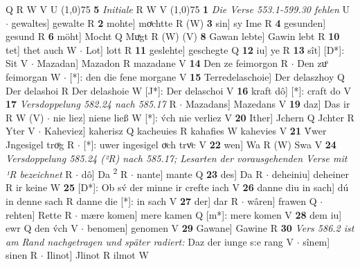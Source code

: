 \documentclass[8pt,a4paper,notitlepage]{article}
\begin{document}
\begin{table}[ht]
\begin{minipage}[t]{0.5\linewidth}
Q R W V U \newline
\line(1,0){75} \newline
\textbf{5} \textit{Initiale} R W V  \newline
\line(1,0){75} \newline
\textbf{1} \textit{Die Verse 553.1-599.30 fehlen} U   $\cdot$ gewaltes] gewalte R \textbf{2} mohte] moͯchtte R (W) \textbf{3} sin] sy Ime R \textbf{4} gesunden] gesund R \textbf{6} möht] Mocht Q Muͯgt R (W) (V) \textbf{8} Gawan lebte] Gawin lebt R \textbf{10} tet] thet auch W  $\cdot$ Lot] lott R \textbf{11} geslehte] geschegte Q \textbf{12} iu] ye R \textbf{13} sît] [D*]: Sit V  $\cdot$ Mazadan] Mazadon R mazadane V \textbf{14} Den ze feimorgon R  $\cdot$ Den zuͦ feimorgan W  $\cdot$ [*]: den die fene morgane V \textbf{15} Terredelaschoie] Der delaszhoy Q Der delashoi R Der delashoie W [J*]: Der delaschoi V \textbf{16} kraft dô] [*]: craft do V \textbf{17} \textit{Versdoppelung 582.24 nach 585.17} R   $\cdot$ Mazadans] Mazedans V \textbf{19} daz] Das ir R W (V)  $\cdot$ nie liez] niene ließ W [*]: v́ch nie verliez V \textbf{20} Ither] Jchern Q Jchter R Yter V  $\cdot$ Kaheviez] kaherisz Q kacheuies R kahafies W kahevies V \textbf{21} V́wer Jngesigel troͧg R  $\cdot$ [*]: uwer ingesigel oͮch trvͦc V \textbf{22} wen] Wa R (W) Swa V \textbf{24} \textit{Versdoppelung 585.24 (²R) nach 585.17; Lesarten der vorausgehenden Verse mit ¹R bezeichnet} R   $\cdot$ dô] Da \textsuperscript{2}\hspace{-1.3mm} R  $\cdot$ nante] mante Q \textbf{23} des] Da R  $\cdot$ deheiniu] deheiner R ir keine W \textbf{25} [D*]: Ob sv́ der minne ir crefte iach V \textbf{26} danne diu in sach] dú in denne sach R danne die [*]: in sach V \textbf{27} der] dar R  $\cdot$ wâren] frawen Q  $\cdot$ rehten] Rette R  $\cdot$ mære komen] mere kamen Q [m*]: mere komen V \textbf{28} dem iu] ewr Q den v́ch V  $\cdot$ benomen] genomen V \textbf{29} Gawane] Gawine R \textbf{30} \textit{Vers 586.2 ist am Rand nachgetragen und später radiert:} Daz der iunge s:e rang V   $\cdot$ sînem] sinen R  $\cdot$ Ilinot] Jlinot R ilmot W \newline
\end{minipage}
\end{table}
\end{document}
